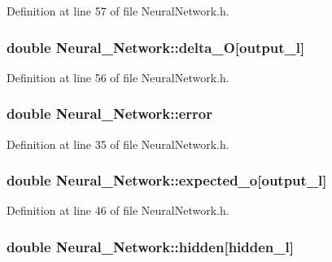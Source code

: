Definition at line 57 of file Neural\-Network.\-h.

\hypertarget{a00003_ae5f829ba5e65ae91d5c4feda5f66e37a}{
\subsubsection[{delta\-\_\-\-O}]{\setlength{\rightskip}{0pt plus 5cm}double Neural\-\_\-\-Network\-::delta\-\_\-\-O\mbox{[}{\bf output\-\_\-l}\mbox{]}\hspace{0.3cm}{\ttfamily [private]}}}\label{d1/d7c/a00003_ae5f829ba5e65ae91d5c4feda5f66e37a}


Definition at line 56 of file Neural\-Network.\-h.

\hypertarget{a00003_a2ffe42aee798e268d4bbf0f3428ba430}{
\subsubsection[{error}]{\setlength{\rightskip}{0pt plus 5cm}double Neural\-\_\-\-Network\-::error\hspace{0.3cm}{\ttfamily [private]}}}\label{d1/d7c/a00003_a2ffe42aee798e268d4bbf0f3428ba430}


Definition at line 35 of file Neural\-Network.\-h.

\hypertarget{a00003_a8d632cf69d2fcd076e473aba1ae74702}{
\subsubsection[{expected\-\_\-o}]{\setlength{\rightskip}{0pt plus 5cm}double Neural\-\_\-\-Network\-::expected\-\_\-o\mbox{[}{\bf output\-\_\-l}\mbox{]}\hspace{0.3cm}{\ttfamily [private]}}}\label{d1/d7c/a00003_a8d632cf69d2fcd076e473aba1ae74702}


Definition at line 46 of file Neural\-Network.\-h.

\hypertarget{a00003_a5b31deacdc5c63e687d6ebc086b761ab}{
\subsubsection[{hidden}]{\setlength{\rightskip}{0pt plus 5cm}double Neural\-\_\-\-Network\-::hidden\mbox{[}{\bf hidden\-\_\-l}\mbox{]}\hspace{0.3cm}{\ttfamily [private]}}}\label{d1/d7c/a00003_a5b31deacdc5c63e687d6ebc086b761ab}


